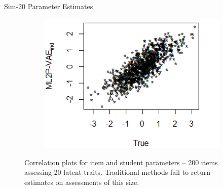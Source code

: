 \documentclass{beamer}
\theoremstyle{definition}
\begin{document}
\begin{frame}{Sim-20 Parameter Estimates}
\begin{figure}[h]
\begin{subfigure}{.32\textwidth}
    \end{subfigure}
    \begin{subfigure}{.32\textwidth}
      \centering
      \includegraphics[width=.9\linewidth]{../img/ml_journal_results/20skills/vae_ind_theta_20skills.png}
    \end{subfigure}
    \caption*{\scriptsize Correlation plots for item and student parameters -- 200 items assessing 20 latent traits. Traditional methods fail to return estimates on assessments of this size.}
    \label{fig:20skill_cor}
\end{figure}

\end{frame}
\end{document}
